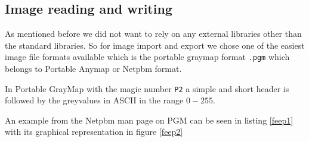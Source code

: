 \subsection{Image reading and writing}
\par As mentioned before we did not want to rely on any external libraries other than the standard libraries. So for image import and export we chose one of the easiest image file formats available which is the portable graymap format \verb!.pgm! which belongs to Portable Anymap or Netpbm format.
\par In Portable GrayMap with the magic number \verb!P2! a simple and short header is followed by the greyvalues in ASCII in the range \(0-255\).
\par An example from the Netpbm man page on PGM can be seen in listing \ref{feep1} with its graphical representation in figure \ref{feep2}

